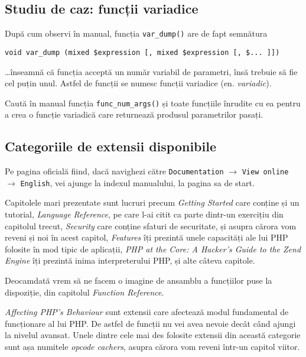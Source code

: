 \subsection{Studiu de caz: funcții variadice}
După cum observi în manual, funcția \texttt{var\_dump()}
are de fapt semnătura
\begin{verbatim}
void var_dump (mixed $expression [, mixed $expression [, $... ]])
\end{verbatim}
\ldots înseamnă că funcția acceptă un număr variabil
de parametri, însă trebuie să fie cel puțin unul.
Astfel de funcții se numesc funcții variadice (en. \textsl{variadic}).

\begin{Exercise}[title={Crează o funcție variadică}]
Caută în manual funcția \texttt{func\_num\_args()} și
toate funcțiile înrudite cu ea pentru a crea
o funcție variadică care returnează produsul parametrilor
pasați.

% 
\end{Exercise}


\subsection{Categoriile de extensii disponibile}
Pe pagina oficială fiind, dacă navighezi către
\texttt{Documentation} $\rightarrow$ \texttt{View online}
$\rightarrow$ \texttt{English},
vei ajunge la indexul
manualului, la pagina sa de start.

Capitolele mari prezentate sunt lucruri precum
\textit{Getting Started} care conține și un tutorial,
\textit{Language Reference}, pe care l-ai
citit ca parte dintr-un exercițiu din capitolul trecut,
\textit{Security} care conține sfaturi de securitate,
și asupra cărora vom reveni și noi
în acest capitol, \textit{Features} îți prezintă
unele capacități ale lui PHP folosite
în mod tipic de aplicații, \textit{PHP at the Core: A Hacker's Guide to the Zend Engine}
îți prezintă inima interpreterului PHP, și alte câteva capitole.

Deocamdată vrem să ne facem o imagine de ansamblu a funcțiilor
puse la dispoziție, din capitolul \textit{Function Reference}.

\textit{Affecting PHP's Behaviour} sunt extensii care afectează
modul fundamental de funcționare al lui PHP. De astfel de funcții
nu vei avea nevoie decât când ajungi la nivelul avansat. Unele
dintre cele mai des folosite extensii din această categorie sunt
așa numitele \textit{opcode cachers},
asupra cărora vom reveni într-un capitol viitor.

